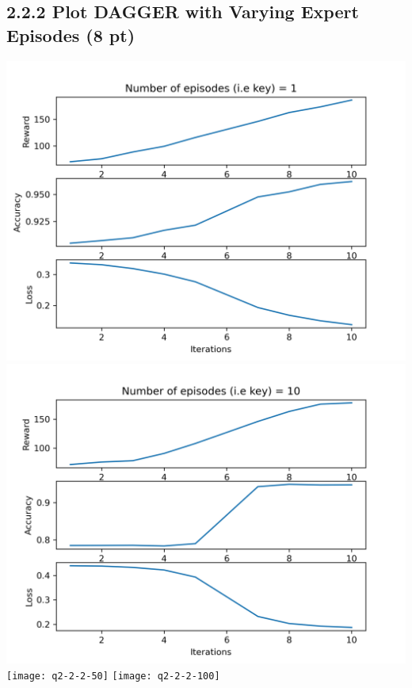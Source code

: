 \documentclass[12pt]{article}
\begin{document}
\subsection*{2.2.2 Plot DAGGER with Varying Expert Episodes (8 pt)}
\includegraphics[height= 10cm, width=15.5cm]{q2-2-2-1}
\includegraphics[height= 10cm, width=15.5cm]{q2-2-2-10}
\texttt{[image: q2-2-2-50]}
\texttt{[image: q2-2-2-100]}
\end{document}
